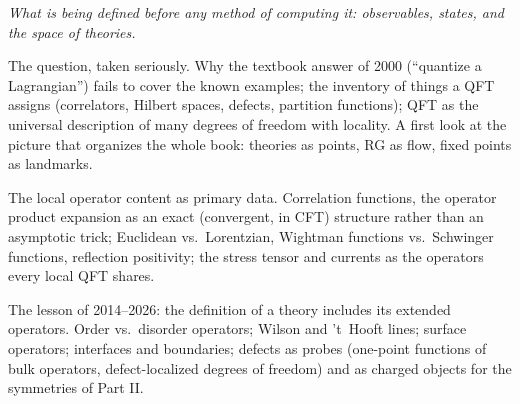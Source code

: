 \newpage


\noin \emph{What is being defined before any method of computing it: observables, states, and the space of theories.}

The question, taken seriously. Why the textbook answer of 2000 (``quantize a Lagrangian'') fails to cover the known examples; the inventory of things a QFT assigns (correlators, Hilbert spaces, defects, partition functions); QFT as the universal description of many degrees of freedom with locality. A first look at the picture that organizes the whole book: theories as points, RG as flow, fixed points as landmarks.

The local operator content as primary data. Correlation functions, the operator product expansion as an exact (convergent, in CFT) structure rather than an asymptotic trick; Euclidean vs.\ Lorentzian, Wightman functions vs.\ Schwinger functions, reflection positivity; the stress tensor and currents as the operators every local QFT shares.

The lesson of 2014--2026: the definition of a theory includes its extended operators. Order vs.\ disorder operators; Wilson and 't~Hooft lines; surface operators; interfaces and boundaries; defects as probes (one-point functions of bulk operators, defect-localized degrees of freedom) and as charged objects for the symmetries of Part II.

